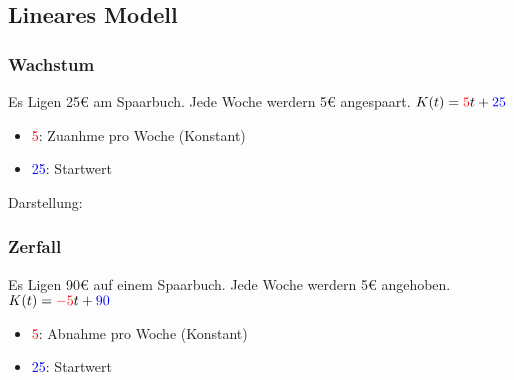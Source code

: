\newpage
\subsection{Lineares Modell}

\subsubsection{Wachstum}
\hfill \break
Es Ligen 25€ am Spaarbuch. Jede Woche werdern 5€ angespaart.
\hfill \break
$K(t)=\textcolor{red}{5}t+\textcolor{blue}{25}$

\begin{itemize}
    \item \textcolor{red}{5}: Zuanhme pro Woche (Konstant)
    \item \textcolor{blue}{25}: Startwert
\end{itemize}

\hfill \break
Darstellung:\\

\newpage
\subsubsection{Zerfall}

\hfill \break
Es Ligen 90€ auf einem Spaarbuch. Jede Woche werdern 5€ angehoben.
\hfill \break
$K(t)=\textcolor{red}{-5}t+\textcolor{blue}{90}$

\begin{itemize}
    \item \textcolor{red}{5}: Abnahme pro Woche (Konstant)
    \item \textcolor{blue}{25}: Startwert
\end{itemize}

